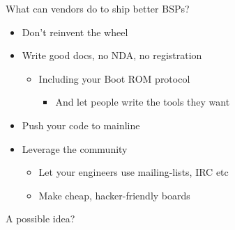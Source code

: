 \documentclass[xetex,table,aspectratio=169]{beamer}
\begin{document}
\begin{frame}{What can vendors do to ship better BSPs?}
  \begin{itemize}
  \item Don't reinvent the wheel
  \item Write good docs, no NDA, no registration
    \begin{itemize}
    \item Including your Boot ROM protocol
      \begin{itemize}
      \item And let people write the tools they want
      \end{itemize}
    \end{itemize}
  \item Push your code to mainline
  \item Leverage the community
    \begin{itemize}
    \item Let your engineers use mailing-lists, IRC etc
    \item Make cheap, hacker-friendly boards
    \end{itemize}
  \end{itemize}
\end{frame}

\begin{frame}{A possible idea?}
  \center
  
  \vspace{0.15\textheight}

    \begin{columns}
      \column{0.5\textheight}

      \column{0.5\textheight}
    \end{columns}

    \vspace{0.15\textheight}
\end{frame}
\end{document}
